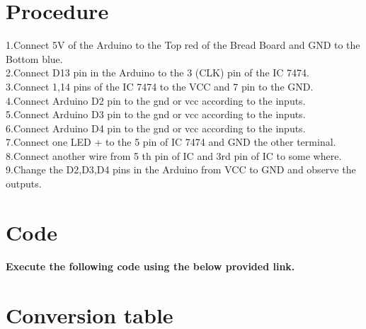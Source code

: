 \documentclass[jornal,10pt,twocolumn]{article}
\begin{document}
\section{Procedure}
1.Connect 5V  of the Arduino to the Top red of the Bread Board  and GND to the Bottom blue.
\\
2.Connect D13 pin in the Arduino to the 3 (CLK) pin of the IC 7474.
\\
3.Connect 1,14  pins of the IC 7474 to the VCC and 7 pin to the GND.
\\
4.Connect  Arduino D2 pin to the gnd or vcc according to the inputs.
\\
5.Connect Arduino D3 pin to the gnd or vcc according to the inputs.
\\
6.Connect Arduino D4 pin to the gnd or vcc according to the inputs.
\\
7.Connect one LED + to the 5 pin of IC 7474 and GND the other terminal.
\\
8.Connect another wire from 5 th pin of IC and 3rd pin of IC to some where.\\
9.Change the D2,D3,D4 pins in the Arduino  from VCC to GND and observe the outputs.
\\

\section{Code}
\textbf{Execute the following code using the below provided link.}\\
\begin{center}
\end{center}

\section{Conversion table}
\end{document}
